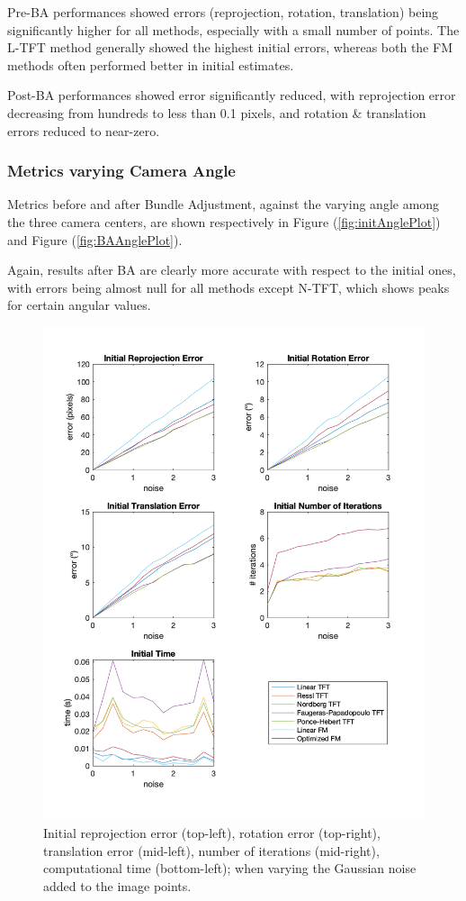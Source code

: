 Pre-\acs{BA} performances showed errors (reprojection, rotation, translation) being significantly higher for all methods, especially with a small number of points. The \acs{L-TFT} method generally showed the highest initial errors, whereas both the \acs{FM} methods often performed better in initial estimates.

Post-\acs{BA} performances showed error significantly reduced, with reprojection error decreasing from hundreds to less than 0.1 pixels, and rotation \& translation errors reduced to near-zero.

\subsubsection*{Metrics varying Camera Angle}
Metrics before and after Bundle Adjustment, against the varying angle among the three camera centers, are shown respectively in Figure (\ref{fig:initAnglePlot}) and Figure (\ref{fig:BAAnglePlot}).

Again, results after \acs{BA} are clearly more accurate with respect to the initial ones, with errors being almost null for all methods except \acs{N-TFT}, which shows peaks for certain angular values.

\begin{figure}[p]
	\centering
	\includegraphics[width=1\textwidth]{Experiments/Synthetic/noise/INITnoisePlots.png}
	\caption[Synthetic Trial varying Gaussian Noise]{Initial reprojection error (top-left), rotation error (top-right), translation error (mid-left), number of iterations (mid-right), computational time (bottom-left); when varying the Gaussian noise added to the image points.}
	\label{fig:initNoisePlot}
\end{figure}

